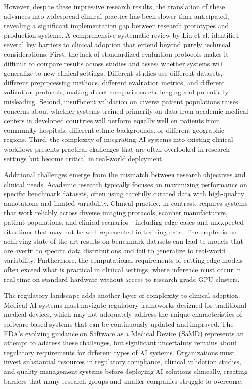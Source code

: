 \documentclass[12pt,a4paper]{article}
\begin{document}
However, despite these impressive research results, the translation of these advances into widespread clinical practice has been slower than anticipated, revealing a significant implementation gap between research prototypes and production systems. A comprehensive systematic review by Liu et al. \cite{liu2019comparison} identified several key barriers to clinical adoption that extend beyond purely technical considerations. First, the lack of standardized evaluation protocols makes it difficult to compare results across studies and assess whether systems will generalize to new clinical settings. Different studies use different datasets, different preprocessing methods, different evaluation metrics, and different validation protocols, making direct comparisons challenging and potentially misleading. Second, insufficient validation on diverse patient populations raises concerns about whether systems trained primarily on data from academic medical centers in developed countries will perform equally well on patients from community hospitals, different ethnic backgrounds, or different geographic regions. Third, the complexity of integrating AI systems into existing clinical workflows presents practical challenges that are often overlooked in research settings but become critical in real-world deployment.

Additional challenges emerge from the mismatch between research objectives and clinical needs. Academic research typically focuses on maximizing performance on specific benchmark datasets, often using carefully curated data with high-quality annotations and limited variability. Clinical practice, in contrast, requires systems that work reliably across diverse imaging protocols, scanner manufacturers, patient populations, and clinical scenarios—including edge cases and unexpected situations that may not be well-represented in training data. The emphasis on achieving state-of-the-art results on benchmark datasets can lead to models that are overfit to specific data distributions and fail to generalize to real-world variability. Furthermore, the computational requirements of cutting-edge models often exceed what is practical in clinical settings, where inference must occur in real-time on standard hardware without access to research-grade GPU clusters.

The regulatory landscape adds another layer of complexity to clinical adoption. Medical AI systems must navigate regulatory frameworks designed for traditional medical devices, which may not adequately address the unique characteristics of software-based systems that can be continuously updated and improved. The FDA's evolving guidance on Software as a Medical Device (SaMD) represents an attempt to address these challenges, but significant uncertainty remains about regulatory requirements for different types of AI systems. Organizations must invest substantial resources in regulatory compliance, clinical validation studies, and quality management systems before deploying AI solutions clinically, creating barriers that many research groups and smaller companies struggle to overcome.
\end{document}
